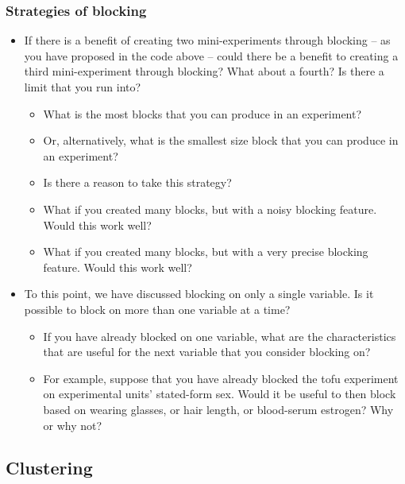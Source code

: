 \documentclass[
]{article}
\providecommand{\tightlist}{%
  \setlength{\itemsep}{0pt}\setlength{\parskip}{0pt}}
\begin{document}
\hypertarget{strategies-of-blocking}{%
\subsubsection{Strategies of blocking}\label{strategies-of-blocking}}

\begin{itemize}
\item
  If there is a benefit of creating two mini-experiments through blocking -- as you have proposed in the code above -- could there be a benefit to creating a third mini-experiment through blocking? What about a fourth? Is there a limit that you run into?

  \begin{itemize}
  \tightlist
  \item
    What is the most blocks that you can produce in an experiment?
  \item
    Or, alternatively, what is the smallest size block that you can produce in an experiment?
  \item
    Is there a reason to take this strategy?
  \item
    What if you created many blocks, but with a noisy blocking feature. Would this work well?
  \item
    What if you created many blocks, but with a very precise blocking feature. Would this work well?
  \end{itemize}
\item
  To this point, we have discussed blocking on only a single variable. Is it possible to block on more than one variable at a time?

  \begin{itemize}
  \tightlist
  \item
    If you have already blocked on one variable, what are the characteristics that are useful for the next variable that you consider blocking on?
  \item
    For example, suppose that you have already blocked the tofu experiment on experimental units' stated-form sex. Would it be useful to then block based on wearing glasses, or hair length, or blood-serum estrogen? Why or why not?
  \end{itemize}
\end{itemize}

\hypertarget{clustering}{%
\subsection{Clustering}\label{clustering}}
\end{document}
